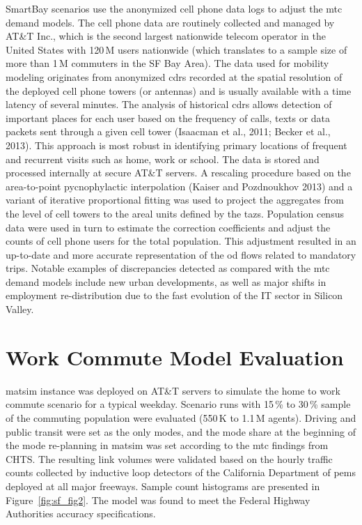 SmartBay scenarios use the anonymized cell phone data logs to adjust the \gls{mtc} demand models. The cell phone data are routinely collected and managed by AT\&T Inc., which is the second largest nationwide telecom operator in the United States with 120\,M users nationwide (which translates to a sample size of more than 1\,M commuters in the SF Bay Area). The data used for mobility modeling originates from anonymized \glspl{cdr} recorded at the spatial resolution of the deployed cell phone towers (or antennas) and is usually available with a time latency of several minutes. The analysis of historical \glspl{cdr} allows detection of important places for each user based on the frequency of calls, texts or data packets sent through a given cell tower (Isaacman et al., 2011; Becker et al., 2013). This approach is most robust in identifying primary locations of frequent and recurrent visits such as home, work or school. The data is stored and processed internally at secure AT\&T servers. A rescaling procedure based on the area-to-point pycnophylactic interpolation (Kaiser and Pozdnoukhov 2013) and a variant of iterative proportional fitting was used to project the aggregates from the level of cell towers to the areal units defined by the \glspl{taz}. Population census data were used in turn to estimate the correction coefficients and adjust the counts of cell phone users for the total population. This adjustment resulted in an up-to-date and more accurate representation of the \gls{od} flows related to mandatory trips. Notable examples of discrepancies detected as compared with the \gls{mtc} demand models include new urban developments, as well as major shifts in employment re-distribution due to the fast evolution of the IT sector in Silicon Valley.

\section{Work Commute Model Evaluation}
\gls{matsim} instance was deployed on AT\&T servers to simulate the home to work commute scenario for a typical weekday. Scenario runs with 15\,\% to 30\,\% sample of the commuting population were evaluated (550\,K to 1.1\,M agents). Driving and public transit were set as the only modes, and the mode share at the beginning of the mode re-planning in \gls{matsim} was set according to the \gls{mtc} findings from CHTS. The resulting link volumes were validated based on the hourly traffic counts collected by inductive loop detectors of the California Department of \gls{pems} deployed at all major freeways. Sample count histograms are presented in Figure~\ref{fig:sf_fig2}. The model was found to meet the Federal Highway Authorities accuracy specifications.

